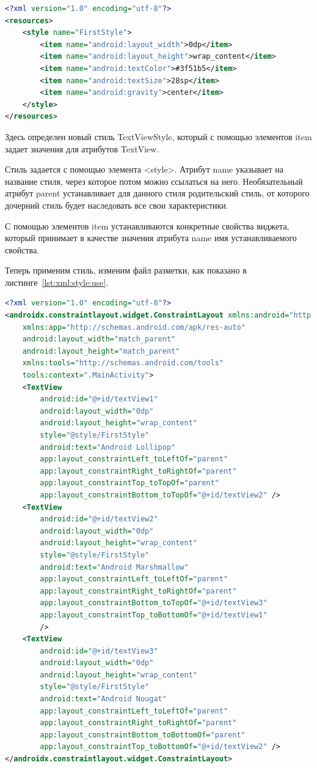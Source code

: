 \begin{lstlisting}[language=XML
	, label=lst:xml:style
	]
<?xml version="1.0" encoding="utf-8"?>
<resources>
    <style name="FirstStyle">
        <item name="android:layout_width">0dp</item>
        <item name="android:layout_height">wrap_content</item>
        <item name="android:textColor">#3f51b5</item>
        <item name="android:textSize">28sp</item>
        <item name="android:gravity">center</item>
    </style>
</resources>
\end{lstlisting}

Здесь определен новый стиль TextViewStyle, который с помощью элементов
item задает значения для атрибутов TextView.\par
Стиль задается с помощью элемента <style>. Атрибут name указывает на
название стиля, через которое потом можно ссылаться на него.
Необязательный атрибут parent устанавливает для данного стиля
родительский стиль, от которого дочерний стиль будет наследовать все свои
характеристики.\par
С помощью элементов item устанавливаются конкретные свойства виджета,
который принимает в качестве значения атрибута name имя
устанавливаемого свойства.\par
Теперь применим стиль, изменим файл разметки, как показано
в листинге~\ref{lst:xml:style:use}.

\begin{lstlisting}[language=XML
	, label=lst:xml:style:use
	]
<?xml version="1.0" encoding="utf-8"?>
<androidx.constraintlayout.widget.ConstraintLayout xmlns:android="http://schemas.android.com/apk/res/android"
    xmlns:app="http://schemas.android.com/apk/res-auto"
    android:layout_width="match_parent"
    android:layout_height="match_parent"
    xmlns:tools="http://schemas.android.com/tools"
    tools:context=".MainActivity">
    <TextView
        android:id="@+id/textView1"
        android:layout_width="0dp"
        android:layout_height="wrap_content"
        style="@style/FirstStyle"
        android:text="Android Lollipop"
        app:layout_constraintLeft_toLeftOf="parent"
        app:layout_constraintRight_toRightOf="parent"
        app:layout_constraintTop_toTopOf="parent"
        app:layout_constraintBottom_toTopOf="@+id/textView2" />
    <TextView
        android:id="@+id/textView2"
        android:layout_width="0dp"
        android:layout_height="wrap_content"
        style="@style/FirstStyle"
        android:text="Android Marshmallow"
        app:layout_constraintLeft_toLeftOf="parent"
        app:layout_constraintRight_toRightOf="parent"
        app:layout_constraintBottom_toTopOf="@+id/textView3"
        app:layout_constraintTop_toBottomOf="@+id/textView1"
        />
    <TextView
        android:id="@+id/textView3"
        android:layout_width="0dp"
        android:layout_height="wrap_content"
        style="@style/FirstStyle"
        android:text="Android Nougat"
        app:layout_constraintLeft_toLeftOf="parent"
        app:layout_constraintRight_toRightOf="parent"
        app:layout_constraintBottom_toBottomOf="parent"
        app:layout_constraintTop_toBottomOf="@+id/textView2" />
</androidx.constraintlayout.widget.ConstraintLayout>
\end{lstlisting}

